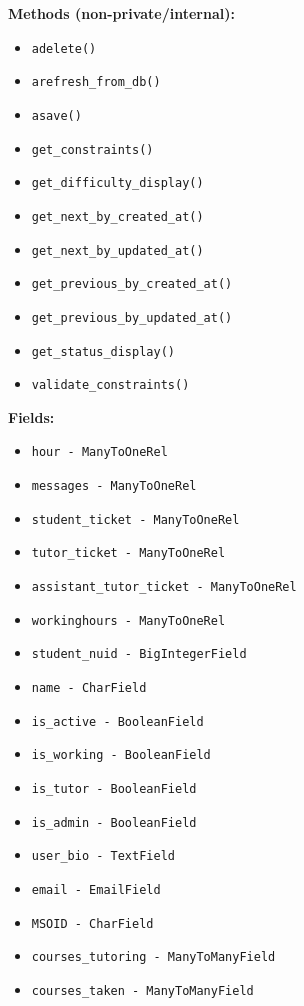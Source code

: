 \documentclass[oneside,openany,obeyspaces]{book}
\begin{document}
\begin{flushleft}
    \textbf{Methods (non-private/internal):}
    \begin{itemize}
        \item \texttt{adelete()}
        \item \texttt{arefresh\_from\_db()}
        \item \texttt{asave()}
        \item \texttt{get\_constraints()}
        \item \texttt{get\_difficulty\_display()}
        \item \texttt{get\_next\_by\_created\_at()}
        \item \texttt{get\_next\_by\_updated\_at()}
        \item \texttt{get\_previous\_by\_created\_at()}
        \item \texttt{get\_previous\_by\_updated\_at()}
        \item \texttt{get\_status\_display()}
        \item \texttt{validate\_constraints()}
    \end{itemize}

    \textbf{Fields:}
    \begin{itemize}
        \item \texttt{hour - ManyToOneRel}
        \item \texttt{messages - ManyToOneRel}
        \item \texttt{student\_ticket - ManyToOneRel}
        \item \texttt{tutor\_ticket - ManyToOneRel}
        \item \texttt{assistant\_tutor\_ticket - ManyToOneRel}
        \item \texttt{workinghours - ManyToOneRel}
        \item \texttt{student\_nuid - BigIntegerField}
        \item \texttt{name - CharField}
        \item \texttt{is\_active - BooleanField}
        \item \texttt{is\_working - BooleanField}
        \item \texttt{is\_tutor - BooleanField}
        \item \texttt{is\_admin - BooleanField}
        \item \texttt{user\_bio - TextField}
        \item \texttt{email - EmailField}
        \item \texttt{MSOID - CharField}
        \item \texttt{courses\_tutoring - ManyToManyField}
        \item \texttt{courses\_taken - ManyToManyField}
    \end{itemize}


\end{flushleft}
\end{document}
